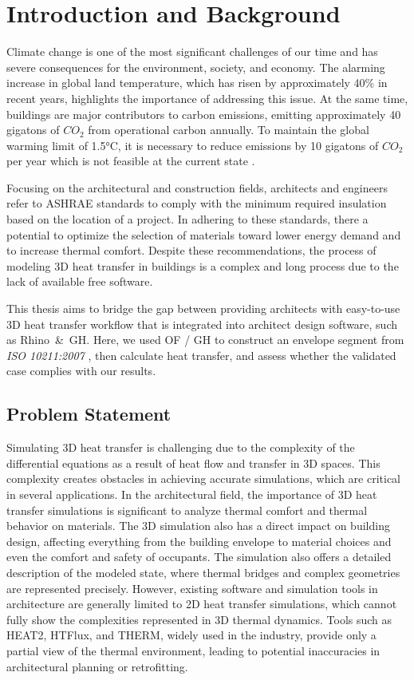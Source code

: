\chapter{Introduction and Background}


Climate change is one of the most significant challenges of our time and has severe consequences for the environment, society, and economy. The alarming increase in global land temperature, which has risen by approximately 40\% \cite{glb} in recent years, highlights the importance of addressing this issue. At the same time, buildings are major contributors to carbon emissions, emitting approximately 40 gigatons of $CO_2$ from operational carbon annually. To maintain the global warming limit of 1.5°C, it is necessary to reduce emissions by 10 gigatons of $CO_2$ per year which is not feasible at the current state \cite{ipcc}.



Focusing on the architectural and construction fields, architects and engineers refer to \gls{ASHRAE} standards to comply with the minimum required insulation based on the location of a project. 
In adhering to these standards, there a potential to optimize the selection of materials toward lower energy demand and to increase thermal comfort. Despite these recommendations, the process of modeling 3D heat transfer in buildings is a complex and long process due to the lack of available free software. 

This thesis aims to bridge the gap between providing architects with easy-to-use 3D heat transfer workflow that is integrated into architect design software, such as Rhino\, \&\, \gls{GH}. Here, we used \gls{OF} / \gls{GH} to construct an envelope segment from \textit{ISO 10211:2007}
\cite{ISO}, then calculate heat transfer, and assess whether the validated case complies with our results. 



\section{Problem Statement}
Simulating 3D heat transfer is challenging due to the complexity of the differential equations as a result of heat flow and transfer in 3D spaces. 
This complexity creates obstacles in achieving accurate simulations, which are critical in several applications. In the architectural field, the importance of 3D heat transfer simulations is significant to analyze thermal comfort and thermal behavior on materials. The 3D simulation also has a direct impact on building design, affecting everything from the building envelope to material choices and even the comfort and safety of occupants. The simulation also offers a detailed description of the modeled state, where thermal bridges and complex geometries are represented precisely.
However, existing software and simulation tools in architecture are generally limited to 2D heat transfer simulations, which cannot fully show the complexities represented in 3D thermal dynamics. Tools such as HEAT2, HTFlux, and THERM, widely used in the industry, provide only a partial view of the thermal environment, leading to potential inaccuracies in architectural planning or retrofitting.

